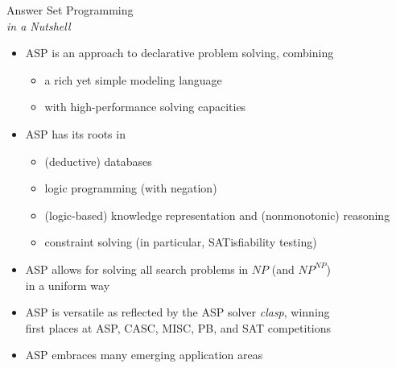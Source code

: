 \begin{frame}{Answer Set Programming\\[-2pt]\small\emph{in a Nutshell}}
  \begin{itemize}
  \item <2->
    ASP is an approach to \alert{declarative problem solving},
    combining
    \begin{itemize}
    \item a rich yet simple modeling language
    \item with high-performance solving capacities
    \end{itemize}
  \item <3-> ASP has its roots in
    \begin{itemize}
    \item (deductive) databases
    \item logic programming (with negation)
    \item (logic-based) knowledge representation and (nonmonotonic) reasoning
    \item constraint solving (in particular, SATisfiability testing)
    \end{itemize}
  \item <4-6>
    ASP allows for solving all search problems in $NP$ (and $NP^{NP}$)
    \\in a uniform way %
  \item <5-6>
    ASP is versatile as reflected by the ASP solver \alert{\textit{clasp}},
    winning\\ first places at ASP, CASC, MISC, PB, and SAT competitions
  \item <6-6> ASP embraces many emerging application areas
  \end{itemize}
\end{frame}
%
